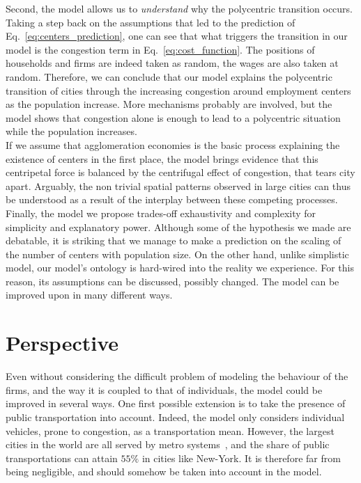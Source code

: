 Second, the model allows us to \emph{understand} why the polycentric transition
occurs. Taking a step back on the assumptions that led to the prediction of
Eq.~\ref{eq:centers_prediction}, one can see that what triggers the transition
in our model is the congestion term in Eq.~\ref{eq:cost_function}. The positions
of households and firms are indeed taken as random, the wages are also taken at
random. Therefore, we can conclude that our model explains the polycentric
transition of cities through the increasing congestion around employment centers
as the population increase. More mechanisms probably are involved, but the model
shows that congestion alone is enough to lead to a polycentric situation while
the population increases.\\

If we assume that agglomeration economies is the basic process explaining the
existence of centers in the first place, the model brings evidence that this
centripetal force is balanced by the centrifugal effect of congestion, that
tears city apart. Arguably, the non trivial spatial patterns observed in large cities can
thus be understood as a result of the interplay between these competing
processes.\\

Finally, the model we propose trades-off exhaustivity and complexity for simplicity and
explanatory power. Although some of the hypothesis we made are debatable, it is
striking that we manage to make a prediction on the scaling of the number of
centers with population size. On the other hand, unlike simplistic model, our
model's ontology is hard-wired into the reality we experience. For this reason,
its assumptions can be discussed, possibly changed. The model can be improved
upon in many different ways.


\section{Perspective}
\label{sec:perspective}

Even without considering the difficult problem of modeling the behaviour of the
firms, and the way it is coupled to that of individuals, the model could be
improved in several ways. One first possible extension is to take the presence
of public transportation into account. Indeed, the model only considers
individual vehicles, prone to congestion, as a transportation mean.  However,
the largest cities in the world are all served by metro
systems~\cite{Roth:2012}, and the share of public transportations can attain
$55\%$ in cities like
New-York. It is therefore far from being negligible, and should somehow be taken
into account in the model.

